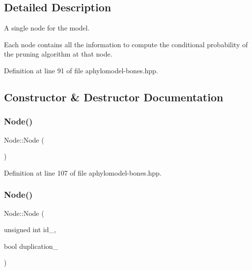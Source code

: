 

\subsection{Detailed Description}
A single node for the model. 

Each node contains all the information to compute the conditional probability of the pruning algorithm at that node. 

Definition at line 91 of file aphylomodel-\/bones.\+hpp.



\subsection{Constructor \& Destructor Documentation}
\mbox{\label{class_node_ad7a34779cad45d997bfd6d3d8043c75f}} 
\subsubsection{\texorpdfstring{Node()}{Node()}\hspace{0.1cm}{\footnotesize\ttfamily [1/3]}}
{\footnotesize\ttfamily Node\+::\+Node (\begin{DoxyParamCaption}{ }\end{DoxyParamCaption})\hspace{0.3cm}{\ttfamily [inline]}}



Definition at line 107 of file aphylomodel-\/bones.\+hpp.

\mbox{\label{class_node_affbe0c59bdcfd5e8068d50b49742cff6}} 
\subsubsection{\texorpdfstring{Node()}{Node()}\hspace{0.1cm}{\footnotesize\ttfamily [2/3]}}
{\footnotesize\ttfamily Node\+::\+Node (\begin{DoxyParamCaption}\item[{unsigned int}]{id\+\_\+,  }\item[{bool}]{duplication\+\_\+ }\end{DoxyParamCaption})\hspace{0.3cm}{\ttfamily [inline]}}



